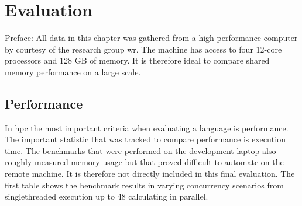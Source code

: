 \chapter{Evaluation}
\label{ch:Evaluation}


Preface: All data in this chapter was gathered from a high performance computer by courtesy of the research group \gls{wr}. The machine has access to four 12-core processors and 128 GB of memory. It is therefore ideal to compare shared memory performance on a large scale.

\section{Performance}
\label{sec:Evaluaton::Performance}

In \acrlong{hpc} the most important criteria when evaluating a language is performance. The important statistic that was tracked to compare performance is execution time. The benchmarks that were performed on the development laptop also roughly measured memory usage but that proved difficult to automate on the remote machine. It is therefore not directly included in this final evaluation. The first table shows the benchmark results in varying concurrency scenarios from singlethreaded execution up to 48 calculating in parallel.


